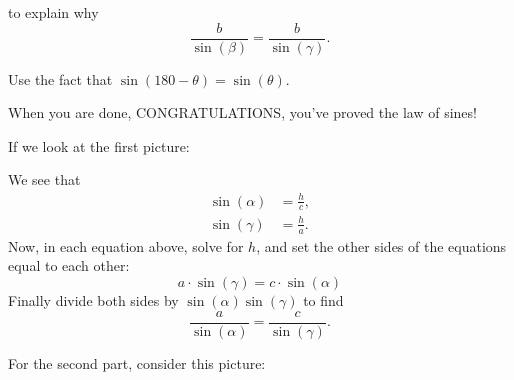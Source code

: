 \documentclass[noauthor,nooutcomes,12pt]{ximera}
\begin{document}
\begin{question}
\begin{center}
  \end{center}
  to explain why
  \[
  \frac{b}{\sin(\beta)} = \frac{b}{\sin(\gamma)}.
  \]
  \begin{hint}
    Use the fact that $\sin(180-\theta) = \sin(\theta)$.
  \end{hint}
  When you are done, CONGRATULATIONS, you've proved the law of sines!
  \begin{freeResponse}
    If we look at the first picture:
    \begin{center}
    \end{center}
    We see that
    \begin{align*}
      \sin(\alpha) &= \frac{h}{c},\\
      \sin(\gamma) &= \frac{h}{a}.
    \end{align*}
    Now, in each equation above, solve for $h$, and set the other
    sides of the equations equal to each other:
    \[
    a\cdot \sin(\gamma)=c\cdot \sin(\alpha)
    \]
    Finally divide both sides by $\sin(\alpha)\sin(\gamma)$ to find
    \[
    \frac{a}{\sin(\alpha)} = \frac{c}{\sin(\gamma)}.
    \]

    
    For the second part, consider this picture:
    \begin{center}
\end{center}
\end{freeResponse}
\end{question}
\end{document}
